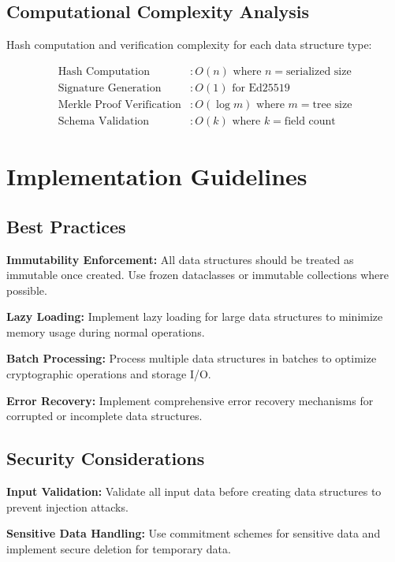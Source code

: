 \documentclass[12pt,a4paper]{article}
\begin{document}
\subsection{Computational Complexity Analysis}

Hash computation and verification complexity for each data structure type:

\begin{align}
\text{Hash Computation} &: O(n) \text{ where } n = \text{serialized size} \\
\text{Signature Generation} &: O(1) \text{ for Ed25519} \\
\text{Merkle Proof Verification} &: O(\log m) \text{ where } m = \text{tree size} \\
\text{Schema Validation} &: O(k) \text{ where } k = \text{field count}
\end{align}

\section{Implementation Guidelines}

\subsection{Best Practices}

\textbf{Immutability Enforcement:} All data structures should be treated as immutable once created. Use frozen dataclasses or immutable collections where possible.

\textbf{Lazy Loading:} Implement lazy loading for large data structures to minimize memory usage during normal operations.

\textbf{Batch Processing:} Process multiple data structures in batches to optimize cryptographic operations and storage I/O.

\textbf{Error Recovery:} Implement comprehensive error recovery mechanisms for corrupted or incomplete data structures.

\subsection{Security Considerations}

\textbf{Input Validation:} Validate all input data before creating data structures to prevent injection attacks.

\textbf{Sensitive Data Handling:} Use commitment schemes for sensitive data and implement secure deletion for temporary data.
\end{document}
